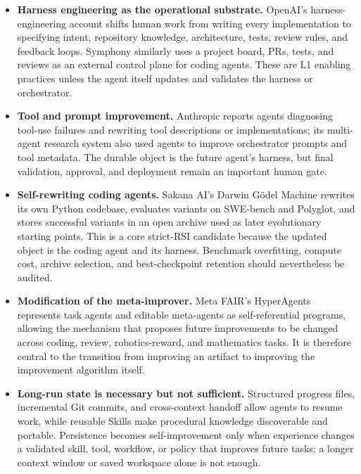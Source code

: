 \begin{itemize}
  \item \textbf{Harness engineering as the operational substrate.}
  OpenAI's harness-engineering account shifts human work from writing every
  implementation to specifying intent, repository knowledge, architecture,
  tests, review rules, and feedback loops. Symphony similarly uses a project
  board, PRs, tests, and reviews as an external control plane for coding agents.
  These are L1 enabling practices unless the agent itself updates and validates
  the harness or orchestrator.

  \item \textbf{Tool and prompt improvement.}
  Anthropic reports agents diagnosing tool-use failures and rewriting tool
  descriptions or implementations; its multi-agent research system also used
  agents to improve orchestrator prompts and tool metadata. The durable object
  is the future agent's harness, but final validation, approval, and deployment
  remain an important human gate.

  \item \textbf{Self-rewriting coding agents.}
  Sakana AI's Darwin G\"odel Machine rewrites its own Python codebase, evaluates
  variants on SWE-bench and Polyglot, and stores successful variants in an open
  archive used as later evolutionary starting points. This is a core strict-RSI
  candidate because the updated object is the coding agent and its harness.
  Benchmark overfitting, compute cost, archive selection, and best-checkpoint
  retention should nevertheless be audited.

  \item \textbf{Modification of the meta-improver.}
  Meta FAIR's HyperAgents represents task agents and editable meta-agents as
  self-referential programs, allowing the mechanism that proposes future
  improvements to be changed across coding, review, robotics-reward, and
  mathematics tasks. It is therefore central to the transition from improving
  an artifact to improving the improvement algorithm itself.

  \item \textbf{Long-run state is necessary but not sufficient.}
  Structured progress files, incremental Git commits, and cross-context handoff
  allow agents to resume work, while reusable Skills make procedural knowledge
  discoverable and portable. Persistence becomes self-improvement only when
  experience changes a validated skill, tool, workflow, or policy that improves
  future tasks; a longer context window or saved workspace alone is not enough.
\end{itemize}


